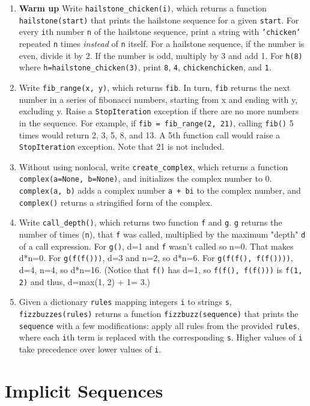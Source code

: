 \documentclass[a4paper]{book}
\begin{document}
\begin{enumerate}
\item \textbf{Warm up} Write {\tt hailstone\_chicken(i)}, which returns a function {\tt hailstone(start)} that prints the hailstone sequence for a given {\tt start}. For every {\tt i}th number {\tt n} of the hailstone sequence, print a string with {\tt 'chicken'} repeated {\tt n} times \textit{instead} of {\tt n} itself. For a hailstone sequence, if the number is even, divide it by 2. If the number is odd, multiply by 3 and add 1. For {\tt h(8)} where {\tt h=hailstone\_chicken(3)}, print {\tt 8}, {\tt 4}, {\tt chickenchicken}, and {\tt 1}.
\item Write {\tt fib\_range(x, y)}, which returns {\tt fib}. In turn, {\tt fib} returns the next number in a series of fibonacci numbers, starting from x and ending with y, excluding y. Raise a {\tt StopIteration} exception if there are no more numbers in the sequence. For example, if {\tt fib = fib\_range(2, 21)}, calling {\tt fib()} 5 times would return 2, 3, 5, 8, and 13. A 5th function call would raise a {\tt StopIteration} exception. Note that 21 is not included.
\item Without using nonlocal, write {\tt create\_complex}, which returns a function {\tt complex(a=None, b=None)}, and initializes the complex number to 0. {\tt complex(a, b)} adds a complex number {\tt a + bi} to the complex number, and {\tt complex()} returns a stringified form of the complex.
\item Write {\tt call\_depth()}, which returns two function {\tt f} and {\tt g}. {\tt g} returns the number of times ({\tt n}), that {\tt f} was called, multiplied by the maximum "depth" {\tt d} of a call expression. For {\tt g()}, d=1 and {\tt f} wasn't called so n=0. That makes d*n=0. For {\tt g(f(f()))},  d=3 and  n=2, so d*n=6. For {\tt g(f(f(), f(f())))}, d=4, n=4, so d*n=16. (Notice that {\tt f()} has d=1, so {\tt f(f(), f(f()))} is {\tt f(1, 2)} and thus, d=max(1, 2) + 1= 3.)
\item Given a dictionary {\tt rules} mapping integers {\tt i} to strings {\tt s}, {\tt fizzbuzzes(rules)} returns a function {\tt fizzbuzz(sequence)} that prints the {\tt sequence} with a few modifications: apply all rules from the provided {\tt rules}, where each {\tt i}th term is replaced with the corresponding {\tt s}. Higher values of {\tt i} take precedence over lower values of {\tt i}.
\end{enumerate}

\chapter{Implicit Sequences}
\end{document}
